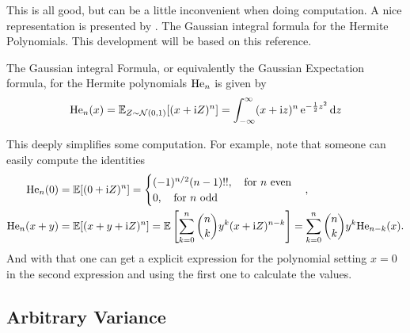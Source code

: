 This is all good, but can be a little inconvenient when doing computation. A nice representation is presented by \cite{nica2025gaussianintegralformulahermite}. The Gaussian integral formula for the Hermite Polynomials. This development will be based on this reference.
\begin{definition}
	The Gaussian integral Formula, or equivalently the Gaussian Expectation formula, for the Hermite polynomials $\mathrm{He}_n$ is given by
	\begin{equation}
		\mathrm{He}_n(x) = \mathbb{E}_{Z \sim \mathcal{N}(0,1)}[(x+\mathrm{i} Z)^n] = \int_{-\infty}^{\infty} (x+\mathrm{i} z)^n \operatorname{e}^{-\frac{1}{2} z^2} \mathrm{d} z
	\end{equation}
	\label{Def: Gaussian integral-expectation formula}
\end{definition}
This deeply simplifies some computation. For example, note that someone can easily compute the identities
\begin{align}
	\mathrm{He}_n(0) & = \mathbb{E}[(0 + \mathrm{i} Z)^n] = \begin{cases}
		(-1)^{n/2}(n-1)!!, \quad \text{for $n$ even} \\
		0, \quad \text{for $n$ odd}
	\end{cases}, \\
	\mathrm{He}_n(x+y) & = \mathbb{E}[(x+y+\mathrm{i} Z)^n] = \mathbb{E}\left[\sum_{k=0}^{n} \binom{n}{k} y^k (x+\mathrm{i} Z)^{n-k}\right] = \sum_{k=0}^{n} \binom{n}{k} y^k \mathrm{He}_{n-k}(x).
\end{align}
And with that one can get a explicit expression for the polynomial setting $x=0$ in the second expression and using the first one to calculate the values.

\subsection{Arbitrary Variance}

